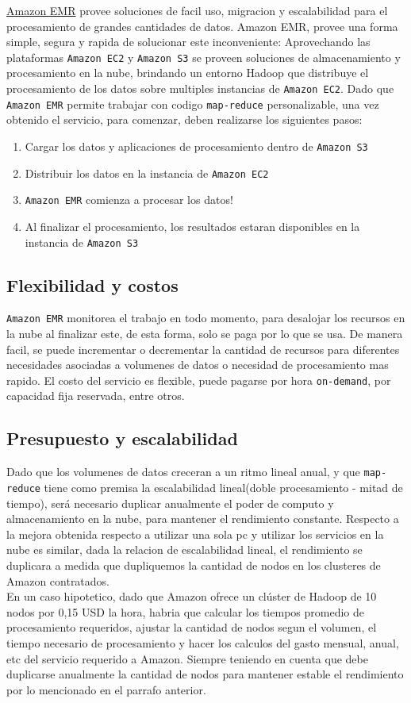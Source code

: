 \documentclass{article}
\begin{document}
\href{http://aws.amazon.com/es/elasticmapreduce/}{Amazon EMR} provee soluciones de facil uso, migracion y escalabilidad para el procesamiento de grandes cantidades de 
datos.
Amazon EMR, provee una forma simple, segura y rapida de solucionar este inconveniente: Aprovechando las plataformas \verb|Amazon EC2| y \verb|Amazon S3| se proveen soluciones de almacenamiento y procesamiento en la nube, brindando un entorno Hadoop que distribuye el procesamiento de los datos sobre multiples instancias de \verb|Amazon EC2|. Dado que \verb|Amazon EMR| permite trabajar con codigo \verb|map-reduce| personalizable, una vez obtenido el servicio, para comenzar, deben realizarse los siguientes pasos:
\begin{enumerate}
  \item Cargar los datos y aplicaciones de procesamiento dentro de \verb|Amazon S3|
  \item Distribuir los datos en la instancia de \verb|Amazon EC2|
  \item \verb|Amazon EMR| comienza a procesar los datos!
  \item Al finalizar el procesamiento, los resultados estaran disponibles en la instancia de \verb|Amazon S3|
\end{enumerate}

\subsection{Flexibilidad y costos}
\verb|Amazon EMR| monitorea el trabajo en todo momento, para desalojar los recursos en la nube al finalizar este, de esta forma, solo se paga por lo que se usa.
De manera facil, se puede incrementar o decrementar la cantidad de recursos para diferentes necesidades asociadas a volumenes de datos o necesidad de procesamiento mas rapido. El costo del servicio es flexible, puede pagarse por hora \verb|on-demand|, por capacidad fija reservada, entre otros. 

\subsection{Presupuesto y escalabilidad}
Dado que los volumenes de datos creceran a un ritmo lineal anual, y que \verb|map-reduce| tiene como premisa la escalabilidad lineal(doble procesamiento - mitad de tiempo), será necesario duplicar anualmente el poder de computo y almacenamiento en la nube, para mantener el rendimiento constante.
Respecto a la mejora obtenida respecto a utilizar una sola pc y utilizar los servicios en la nube es similar, dada la relacion de escalabilidad lineal, el rendimiento se duplicara a medida que dupliquemos la cantidad de nodos en los clusteres de Amazon contratados.\\

En un caso hipotetico, dado que Amazon ofrece un clúster de Hadoop de 10 nodos por 0,15 USD la hora, habria que calcular los tiempos promedio de procesamiento requeridos, ajustar la cantidad de nodos segun el volumen, el tiempo necesario de procesamiento y hacer los calculos del gasto mensual, anual, etc del servicio requerido a Amazon. Siempre teniendo en cuenta que debe duplicarse anualmente la cantidad de nodos para mantener estable el rendimiento por lo mencionado en el parrafo anterior.
\end{document}
